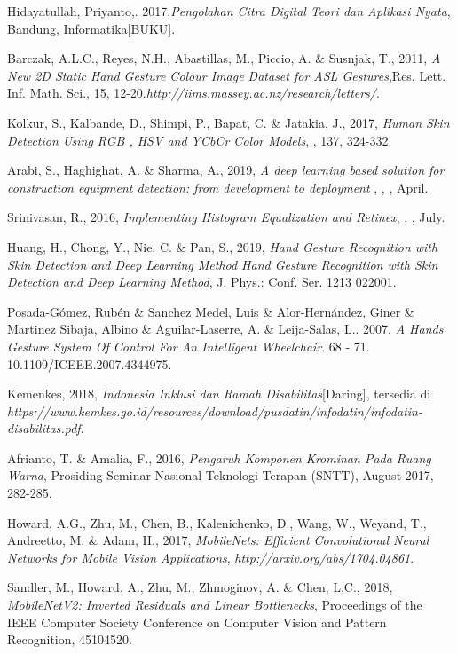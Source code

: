 \documentclass{tesisilkomugm}
\begin{document}
\begin{thebibliography}{99}
Hidayatullah, Priyanto,. 2017,\emph{Pengolahan Citra Digital Teori dan Aplikasi Nyata}, 
Bandung, Informatika[BUKU].

Barczak, A.L.C., Reyes, N.H., Abastillas, M., Piccio, A. \& Susnjak, T., 2011, \emph{A New 2D Static Hand Gesture Colour Image Dataset for ASL Gestures},Res. Lett. Inf. Math. Sci., 15, 12-20.\emph{http://iims.massey.ac.nz/research/letters/}.

Kolkur, S., Kalbande, D., Shimpi, P., Bapat, C. \& Jatakia, J., 2017, \emph{Human Skin Detection Using RGB , HSV and YCbCr Color Models}, , 137, 324-332.

Arabi, S., Haghighat, A. \& Sharma, A., 2019, \emph{A deep learning based solution for construction equipment detection: from development to deployment} , , , April.

Srinivasan, R., 2016, \emph{Implementing Histogram Equalization and Retinex}, , , July.

Huang, H., Chong, Y., Nie, C. \& Pan, S., 2019, \emph{Hand Gesture Recognition with Skin Detection and Deep Learning Method Hand Gesture Recognition with Skin Detection and Deep Learning Method}, J. Phys.: Conf. Ser. 1213 022001.

Posada-Gómez, Rubén \& Sanchez Medel, Luis \& Alor-Hernández, Giner \& Martinez Sibaja, Albino \& Aguilar-Laserre, A. \& Leija-Salas, L.. 2007. \emph{A Hands Gesture System Of Control For An Intelligent Wheelchair}. 68 - 71. 10.1109/ICEEE.2007.4344975. 

Kemenkes, 2018, \emph{Indonesia Inklusi  dan Ramah Disabilitas}[Daring], tersedia di \emph{https://www.kemkes.go.id/resources/download/pusdatin/infodatin/infodatin-disabilitas.pdf}.

Afrianto, T. \& Amalia, F., 2016, \emph{Pengaruh Komponen Krominan Pada Ruang Warna}, Prosiding Seminar Nasional Teknologi Terapan (SNTT), August 2017, 282-285.

Howard, A.G., Zhu, M., Chen, B., Kalenichenko, D., Wang, W., Weyand, T., Andreetto, M. \& Adam, H., 2017, \emph{MobileNets: Efficient Convolutional Neural Networks for Mobile Vision Applications}, \emph{http://arxiv.org/abs/1704.04861}.

Sandler, M., Howard, A., Zhu, M., Zhmoginov, A. \& Chen, L.C., 2018, \emph{MobileNetV2: Inverted Residuals and Linear Bottlenecks}, Proceedings of the IEEE Computer Society Conference on Computer Vision and Pattern Recognition, 45104520.


\end{thebibliography}
\end{document}
